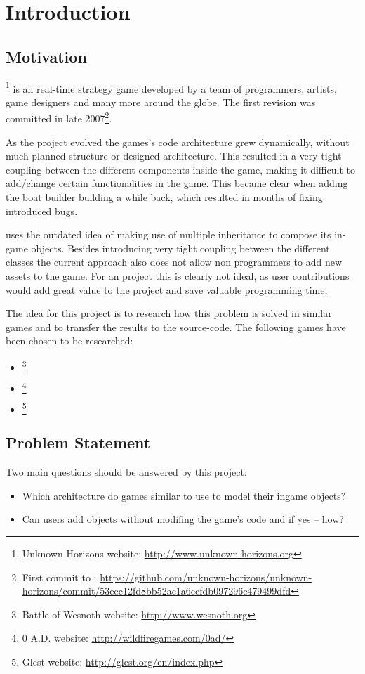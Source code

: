 

\section{Introduction}

\subsection{Motivation}
\UH{}\footnote{Unknown Horizons website: \url{http://www.unknown-horizons.org}} is an \OS{} real-time strategy game developed by a team of programmers, artists, game
designers and many more around the globe. The first revision was committed in late 2007\footnote{First commit to \UH{}:
\url{https://github.com/unknown-horizons/unknown-horizons/commit/53eec12fd8bb52ac1a6ccfdb097296c479499dfd}}.

As the project evolved the games's code architecture grew dynamically, without much planned structure or
designed architecture. This resulted in a very tight coupling between the different components inside the game, making
it difficult to add/change certain functionalities in the game. This became clear when adding the boat builder building
a while back, which resulted in months of fixing introduced bugs.

\UH{} uses the outdated idea of making use of multiple inheritance to compose its in-game objects. Besides introducing
very tight coupling between the different classes the current approach also does not allow non programmers to add new
assets to the game. For an \OS{} project this is clearly not ideal, as user contributions would add great value to the
project and save valuable programming time.

The idea for this project is to research how this problem is solved in similar \OS{} games and to transfer the results to
the \UH source-code. The following games have been chosen to be researched:
\begin{itemize}
    \item \BOW{}\footnote{Battle of Wesnoth website: \url{http://www.wesnoth.org}}
    \item \AD{}\footnote{0 A.D. website: \url{http://wildfiregames.com/0ad/}}
    \item \GLEST{}\footnote{Glest website: \url{http://glest.org/en/index.php}}
\end{itemize}


\subsection{Problem Statement}
Two main questions should be answered by this project:
\begin{itemize}
    \item Which architecture do \OS{} games similar to \UH use to model their ingame objects?
    \item Can users add objects without modifing the game's code and if yes -- how?
\end{itemize}

